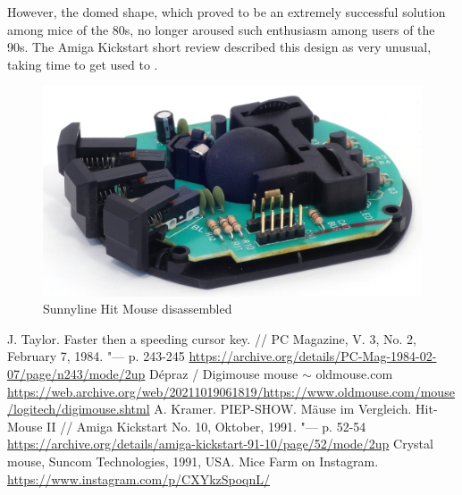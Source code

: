 \documentclass[11pt, a4paper]{article}
\begin{document}
However, the domed shape, which proved to be an extremely successful solution among mice of the 80s, no longer aroused such enthusiasm among users of the 90s. The Amiga Kickstart short review described this design as very unusual, taking time to get used to \cite{sunnyline}.

 \begin{figure}[h]
    \centering
    \includegraphics[scale=0.7]{1982_depraz_digimouse/hitmouse_inside_30.jpg}
    \caption{Sunnyline Hit Mouse disassembled}
    \label{fig:HitMouseInside}
\end{figure}

\begin{thebibliography}{9}
 J. Taylor. Faster then a speeding cursor key. // PC Magazine, V. 3, No. 2, February 7, 1984. "--- p. 243-245 \url{https://archive.org/details/PC-Mag-1984-02-07/page/n243/mode/2up}
 Dépraz / Digimouse mouse $\sim$ oldmouse.com \url{https://web.archive.org/web/20211019061819/https://www.oldmouse.com/mouse/logitech/digimouse.shtml}
 A. Kramer. PIEP-SHOW. M\"ause im Vergleich. Hit-Mouse II // Amiga Kickstart No. 10, Oktober, 1991. "--- p. 52-54 \url{https://archive.org/details/amiga-kickstart-91-10/page/52/mode/2up}
 Crystal mouse, Suncom Technologies, 1991, USA. Mice Farm on Instagram. \url{https://www.instagram.com/p/CXYkzSpoqnL/}
\end{thebibliography}
\end{document}
